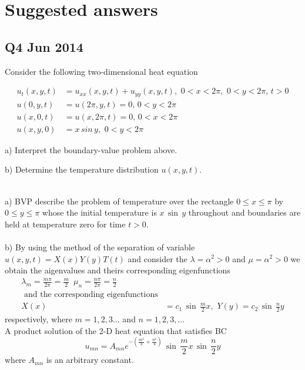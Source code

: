 \section{Suggested answers}
\subsection{Q4 Jun 2014}
\begin{prob}
Consider the following two-dimensional heat equation
\end{prob}
\begin{align*}
u_t(x,y,t)&=u_{xx}(x,y,t)+u_{yy}(x,y,t),\,\,0<x<2\pi,\,\,0<y<2\pi,\,t>0\\
u(0,y,t)&=u(2\pi,y,t)=0,\,0<y<2\pi\\
u(x,0,t)&=u(x,2\pi,t)=0,\,0<x<2\pi\\
u(x,y,0)&=x\,sin\,y,\,\,0<y<2\pi
\end{align*}
\begin{description}
\item a) Interpret the boundary-value problem above.
\item b) Determine the temperature distribution $u(x,y,t)$.\\
\end{description}
\\
a) BVP describe the problem of temperature over the rectangle  $0\le x\le \pi$ by $0\le y\le \pi$ whose the initial temperature is $x\,\sin\,y$ throughout and boundaries are held at temperature zero for time $t>0.$\\
\\
b) By using the method of the separation of variable $u(x,y,t)=X(x)Y(y)T(t)$ and consider the $\lambda=\alpha^2>0$ and $\mu=\alpha^2>0$ we obtain the aigenvalues and theirs corresponding eigenfunctions
\begin{align*}
\lambda_m=\frac{m\pi}{2\pi}=\frac{m}{2}\,\,\,\mu_n=\frac{n\pi}{2\pi}=\frac{n}{2}\\
\text{ and the corresponding eigenfunctions}&\\
X(x)&=c_1\,\sin\,\frac{m}{2}x,\,\,Y(y)=c_2\,\sin\,\frac{n}{2}y
\end{align*}
respectively, where $m=1,2,3\ldots$ and $n=1,2,3,\ldots$\\
A product solution of the 2-D heat equation that satisfies BC
\begin{equation}
u_{mn}=A_{mn}e^{-(\frac{m^2}{4}+\frac{n^2}{4})}\,\sin\,\frac{m}{2}x\,\sin\,\frac{n}{2}y
\end{equation}
where $A_{mn}$ is an arbitrary constant.\\
